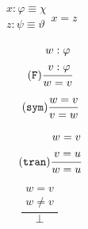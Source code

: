 \documentclass{article}
\theoremstyle{definition}
\theoremstyle{definition}
\theoremstyle{definition}
\newcommand*{\id}{\equiv}
\begin{document}
\begin{figure}[h]
\begin{subfigure}{\textwidth}
\begin{subfigure}{0.24\textwidth}
\begin{equation}
{\begin{split}
                        x: \varphi \id \chi \\
                        z: \psi \id \vartheta
                    \end{split}
                }%
                {x = z}
            \end{equation}
        \end{subfigure}
        \begin{subfigure}{0.24\textwidth}
            \begin{equation}
                \tag{\texttt{F}}
                \frac{
                    \begin{split}
                        w: \varphi \\
                        v: \varphi
                    \end{split}
                }%
                {w = v}
            \end{equation}
        \end{subfigure}
        \begin{subfigure}{0.24\textwidth}
            \begin{equation}
                \tag{\texttt{sym}}
                \frac{
                    w=v
                }%
                {v = w}
            \end{equation}
        \end{subfigure}
        \begin{subfigure}{0.24\textwidth}
            \begin{equation}
                \tag{\texttt{tran}}
                \frac{
                    \begin{split}
                        w=v\\
                        v=u
                    \end{split}
                }%
                {w = u}
            \end{equation}
        \end{subfigure}
        \begin{subfigure}{0.24\textwidth}
            \begin{equation}
                \tag{$\bot_1$}
                \frac{
                    \begin{split}
                        w=v\\
                        w \not = v
                    \end{split}
                }%
                {\bot}
            \end{equation}

\end{subfigure}
\end{subfigure}
\end{figure}
\end{document}
